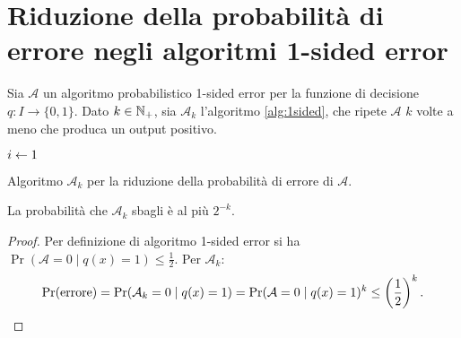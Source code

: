 \section{Riduzione della probabilità di errore negli algoritmi 1-sided error}
\newcommand{\Aalg}{\mathcal A}

Sia $\Aalg$ un algoritmo probabilistico 1-sided error per la funzione di decisione $q:I\to\{0,1\}$.
Dato $k\in\mathbb N_+$, sia $\Aalg_k$ l'algoritmo \ref{alg:1sided}, che ripete $\Aalg$ $k$ volte a meno che produca un output positivo.

\begin{algorithm}
	\DontPrintSemicolon

	$i\leftarrow1$ \;
	\While{$\Out=0\land i\le k$}{
		$\Out\asn\Aalg(x)$ \;
		$i\asn i+1$ \;
	}
	\Return{\Out} \;

	\caption{Algoritmo $\Aalg_k$ per la riduzione della probabilità di errore di $\Aalg$.}
	\label{alg:1sided}
\end{algorithm}

\begin{thm}
	La probabilità che $\Aalg_k$ sbagli è al più $2^{-k}$.
\end{thm}
\begin{proof}
	Per definizione di algoritmo 1-sided error si ha $\Pr(\Aalg=0\mid q(x)=1)\le\frac 12$. Per $\Aalg_k$:
	\begin{equation*}
		\Pr(\text{errore}) = \Pr(\Aalg_k=0\mid q(x)=1) = \Pr(\Aalg=0\mid q(x)=1)^k \le \left(\frac{1}{2}\right)^k \text. \qedhere
	\end{equation*}
\end{proof}
